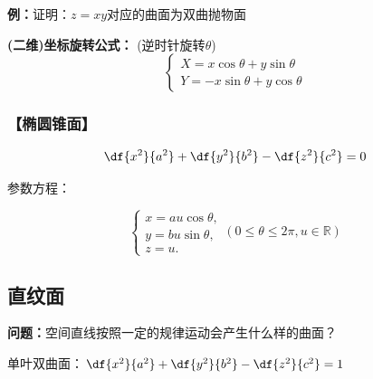{\bf 例：}证明：$z=xy$对应的曲面为双曲抛物面

\begin{center}
\end{center}

{\bf (二维)坐标旋转公式：}{ (逆时针旋转$\theta$)}
$${\left\{\begin{array}{l}
	X=x\cos\theta+y\sin\theta\\
	Y=-x\sin\theta+y\cos\theta
\end{array}\right.}$$

\subsubsection{【椭圆锥面】}

$${\df{x^2}{a^2}+\df{y^2}{b^2}-\df{z^2}{c^2}=0}$$

参数方程：

$$\left\{\begin{array}{l}
	x=au\cos\theta,\\
	y=bu\sin\theta,\\
	z=u.
\end{array}\right.(0\leq\theta\leq 2\pi,u\in\mathbb{R})$$

\subsection{直纹面}

{\bf 问题：}空间直线按照一定的规律运动会产生什么样的曲面？

\begin{center}
	
	单叶双曲面：$\df{x^2}{a^2}+\df{y^2}{b^2}-\df{z^2}{c^2}=1$
\end{center}

